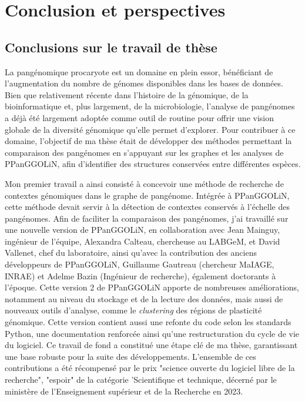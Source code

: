 \part{Conclusion et perspectives}

\chapter{Conclusions sur le travail de thèse}

La pangénomique procaryote est un domaine en plein essor, bénéficiant de l’augmentation du nombre de génomes disponibles dans les bases de données. Bien que relativement récente dans l’histoire de la génomique, de la bioinformatique et, plus largement, de la microbiologie, l’analyse de pangénomes a déjà été largement adoptée comme outil de routine pour offrir une vision globale de la diversité génomique qu’elle permet d’explorer. Pour contribuer à ce domaine, l’objectif de ma thèse était de développer des méthodes permettant la comparaison des pangénomes en s’appuyant sur les graphes et les analyses de PPanGGOLiN, afin d’identifier des structures conservées entre différentes espèces.

Mon premier travail a ainsi consisté à concevoir une méthode de recherche de contextes génomiques dans le graphe de pangénome. Intégrée à PPanGGOLiN, cette méthode devait servir à la détection de contextes conservés à l’échelle des pangénomes. Afin de faciliter la comparaison des pangénomes, j’ai travaillé sur une nouvelle version de PPanGGOLiN, en collaboration avec Jean Mainguy, ingénieur de l’équipe, Alexandra Calteau, chercheuse au LABGeM, et David Vallenet, chef du laboratoire, ainsi qu’avec la contribution des anciens développeurs de PPanGGOLiN, Guillaume Gautreau (chercheur MaIAGE, INRAE) et Adelme Bazin (Ingénieur de recherche), également doctorants à l’époque. Cette version 2 de PPanGGOLiN apporte de nombreuses améliorations, notamment au niveau du stockage et de la lecture des données, mais aussi de nouveaux outils d'analyse, comme le \textit{clustering} des régions de plasticité génomique. Cette version contient aussi une refonte du code selon les standards Python, une documentation renforcée ainsi qu'une restructuration du cycle de vie du logiciel. Ce travail de fond a constitué une étape clé de ma thèse, garantissant une base robuste pour la suite des développements. L’ensemble de ces contributions a été récompensé par le prix "science ouverte du logiciel libre de la recherche", "espoir" de la catégorie ’Scientifique et technique, décerné par le ministère de l’Enseignement supérieur et de la Recherche en 2023.


